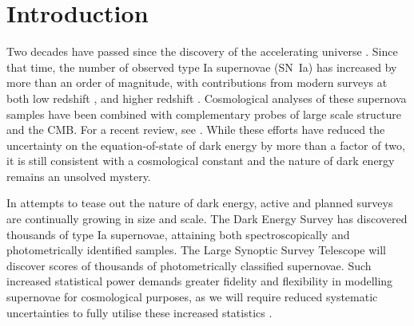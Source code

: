 \documentclass[a4paper,fleqn,usenatbib]{mnras}
\newcommand{\green}{\color{forestgreen}}
\begin{document}

\section{Introduction}




Two decades have passed since the discovery of the accelerating universe \citep{Riess1998, Perlmutter1999}. Since that time, the number of observed type Ia supernovae (SN~Ia) has increased by more than an order of magnitude, with contributions from modern surveys at both low redshift \citep{Bailey2008, Freedman2009, Hicken2009,  Contreras2010, Conley2011}, and higher redshift \citep{Astier2006, Wood-Vasey2007, Frieman2008, Balland2009, Amanullah2010, chambers2016panstarrs, sako2018sdss}. Cosmological analyses of these supernova samples \citep{Kowalski2008, Kessler2009, Conley2011, Suzuki2012, Betoule2014, Rest2014, Scolnic2017} have been combined with complementary probes of large scale structure and the CMB. For a recent review, see \citet{Huterer2018}. {\green While these efforts have reduced the uncertainty on the equation-of-state of dark energy by more than a factor of two, it is still consistent with a cosmological constant and the nature of dark energy remains an unsolved mystery.}


In attempts to tease out the nature of dark energy, active and planned surveys are {\green continually growing in size and scale}. The Dark Energy Survey \citep[DES,][]{Bernstein2012, Abbott2016} has {\green discovered} thousands of type Ia supernovae, attaining both spectroscopically and photometrically identified samples. The Large Synoptic Survey Telescope \citep[LSST,][]{Ivezic2008, LSSTScienceCollaboration2009} will {\green discover} scores of thousands of photometrically classified supernovae. {\green Such increased statistical power demands greater fidelity and flexibility in modelling supernovae for cosmological purposes, as we will require reduced systematic uncertainties to fully utilise these increased statistics} \citep{Betoule2014, Scolnic2017}.
\end{document}
